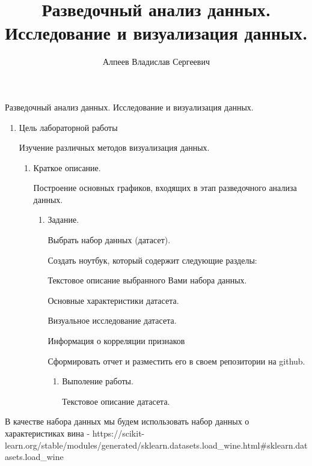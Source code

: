 \documentclass[11pt]{article}
\title{Разведочный анализ данных. Исследование и визуализация данных.}
\author{Алпеев Владислав Сергеевич}
\providecommand{\tightlist}{%
      \setlength{\itemsep}{0pt}\setlength{\parskip}{0pt}}
\begin{document}
    
    \maketitle
    
    

    
    Разведочный анализ данных. Исследование и визуализация данных.

\begin{enumerate}
\def\labelenumi{\arabic{enumi}.}
\tightlist
\item
  Цель лабораторной работы

  Изучение различных методов визуализация данных.

  \begin{enumerate}
  \def\labelenumii{\arabic{enumii}.}
  \setcounter{enumii}{1}
  \tightlist
  \item
    Краткое описание.

    Построение основных графиков, входящих в этап разведочного анализа
    данных.

    \begin{enumerate}
    \def\labelenumiii{\arabic{enumiii}.}
    \setcounter{enumiii}{2}
    \tightlist
    \item
      Задание.

      Выбрать набор данных (датасет).

      Создать ноутбук, который содержит следующие разделы:

      Текстовое описание выбранного Вами набора данных.

      Основные характеристики датасета.

      Визуальное исследование датасета.

      Информация о корреляции признаков

      Сформировать отчет и разместить его в своем репозитории на github.

      \begin{enumerate}
      \def\labelenumiv{\arabic{enumiv}.}
      \setcounter{enumiv}{3}
      \tightlist
      \item
        Выполение работы.

        Текстовое описание датасета.
      \end{enumerate}
    \end{enumerate}
  \end{enumerate}
\end{enumerate}

    В качестве набора данных мы будем использовать набор данных о
характеристиках вина -
https://scikit-learn.org/stable/modules/generated/sklearn.datasets.load\_wine.html\#sklearn.datasets.load\_wine
\end{document}
